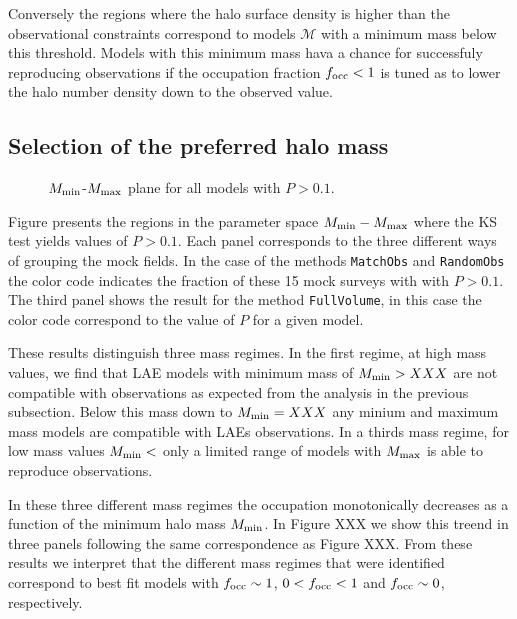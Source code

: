 \documentclass{emulateapj}
\begin{document}
Conversely the regions where the halo surface density is higher than the observational constraints correspond to models ${\mathcal M}$ with a minimum mass below this threshold. Models with this minimum mass hava a chance for successfuly reproducing observations if the occupation fraction $f_{\rm occ}<1$ is tuned as to lower the halo number density down to the observed value. 

\subsection{Selection of the preferred halo mass}

\begin{figure}
\begin{center}
\end{center} 
\caption{$M_{\rm min}$-$M_{\rm max}$ plane for all models with $P>0.1$\label{figure:landscape}.}
\end{figure}

Figure \label{figure:landscape} presents the regions in the parameter space $M_{\rm min}-M_{\rm max}$ where the KS test yields values of $P>0.1$. Each panel corresponds to the three different ways of grouping the mock fields. In the case of the methods {\tt{MatchObs}} and {\tt{RandomObs}} the color code indicates the fraction of these 15 mock surveys with with $P>0.1$. The third panel shows the result for the method {\tt{FullVolume}}, in this case the color code correspond to the value of $P$ for a given model.

These results distinguish three mass regimes. In the first regime, at high mass values, we find that LAE models with minimum mass of $M_{\rm min}>XXX$ are not compatible with observations as expected from the analysis in the previous subsection. Below this mass down to $M_{\rm min}=XXX$ any minium and maximum mass models are compatible with LAEs observations. In a thirds mass regime, for low mass values $M_{\rm min}<$ only a limited range of models with $M_{\rm max}$ is able to reproduce observations.

In these three different mass regimes the occupation monotonically decreases as a function of the minimum halo mass $M_{\rm min}$. In Figure XXX we show this treend in three panels following the same correspondence as Figure XXX. From these results we interpret that the different mass regimes that were identified correspond to best fit models with $f_{\rm occ}\sim 1$, $0<f_{\rm occ}<1$ and $f_{\rm occ}\sim 0$, respectively.
\end{document}
